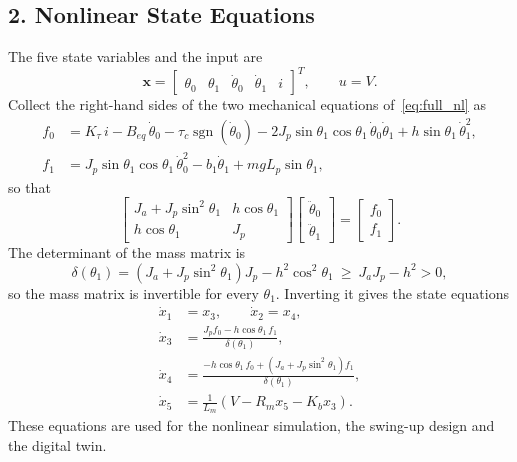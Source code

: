 \documentclass[a4paper,11pt]{article}
\newcommand{\sgn}{\operatorname{sgn}}
\begin{document}
\subsection{2. Nonlinear State Equations}
The five state variables and the input are
\begin{equation}
  \mathbf{x} = \begin{bmatrix} \theta_0 & \theta_1 & \dot\theta_0 & \dot\theta_1 & i \end{bmatrix}^T, \qquad u = V .
\end{equation}
Collect the right-hand sides of the two mechanical equations of~\eqref{eq:full_nl} as
\begin{align}
  f_0 &= K_\tau\, i - B_{eq}\, \dot\theta_0 - \tau_c \sgn(\dot\theta_0) - 2 J_p \sin\theta_1 \cos\theta_1\, \dot\theta_0 \dot\theta_1 + h \sin\theta_1\, \dot\theta_1^2 ,\\
  f_1 &= J_p \sin\theta_1 \cos\theta_1\, \dot\theta_0^2 - b_1 \dot\theta_1 + m g L_p \sin\theta_1 ,
\end{align}
so that
\begin{equation}
  \begin{bmatrix} J_a + J_p \sin^2\theta_1 & h \cos\theta_1 \\ h \cos\theta_1 & J_p \end{bmatrix}
  \begin{bmatrix} \ddot\theta_0 \\ \ddot\theta_1 \end{bmatrix}
  = \begin{bmatrix} f_0 \\ f_1 \end{bmatrix}.
\end{equation}
The determinant of the mass matrix is
\begin{equation}
  \delta(\theta_1) = \left(J_a + J_p \sin^2\theta_1\right) J_p - h^2 \cos^2\theta_1 \ \ge\ J_a J_p - h^2 > 0 ,
\end{equation}
so the mass matrix is invertible for every $\theta_1$. Inverting it gives the state equations
\begin{equation}
\boxed{
\begin{aligned}
  \dot x_1 &= x_3, \qquad \dot x_2 = x_4,\\
  \dot x_3 &= \frac{J_p f_0 - h \cos\theta_1\, f_1}{\delta(\theta_1)},\\
  \dot x_4 &= \frac{-h \cos\theta_1\, f_0 + \left(J_a + J_p \sin^2\theta_1\right) f_1}{\delta(\theta_1)},\\
  \dot x_5 &= \frac{1}{L_m}\left(V - R_m x_5 - K_b x_3\right).
\end{aligned}
}
\label{eq:full_explicit}
\end{equation}
These equations are used for the nonlinear simulation, the swing-up design and the digital twin.
\end{document}

